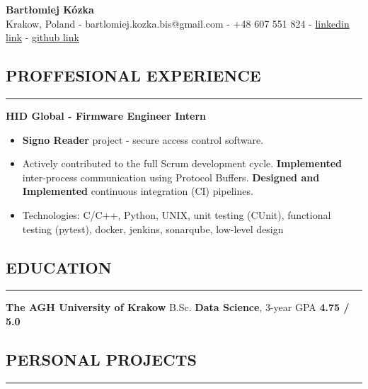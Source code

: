 \documentclass{article}
\begin{document}
\begin{center}
\large{\textbf{Bartłomiej Kózka}} \\
Krakow, Poland - bartlomiej.kozka.bis@gmail.com - +48 607 551 824 - 
    \href{https://www.linkedin.com/in/bart%C5%82omiejkozka44/}{linkedin link} -
    \href{https://github.com/bartlomiejkozka}{github link}
\end{center}


\subsection*{PROFFESIONAL EXPERIENCE}
\vspace{-1.5em}
\rule{\textwidth}{0.1pt}
\vspace{-0.5em}

\noindent\textbf{HID Global - Firmware Engineer Intern}
\begin{itemize}[itemsep=-3pt, topsep=3pt]
    \item \textbf{Signo Reader} project - secure access control software.
    \item Actively contributed to the full Scrum development cycle. 
          \textbf{Implemented} inter-process communication using Protocol Buffers.
          \textbf{Designed and Implemented} continuous integration (CI) pipelines.
    \item Technologies: C/C++, Python, UNIX, unit testing (CUnit), functional testing (pytest), docker, jenkins, sonarqube, low-level design
\end{itemize}


\subsection*{EDUCATION}
\vspace{-1.5em}
\rule{\textwidth}{0.1pt}
\vspace{-0.5em}

\noindent\textbf{The AGH University of Krakow}
B.Sc. \textbf{Data Science}, 3-year GPA \textbf{4.75 / 5.0}


\subsection*{PERSONAL PROJECTS}
\vspace{-1.5em}
\rule{\textwidth}{0.1pt}
\vspace{-0.5em}
\end{document}
